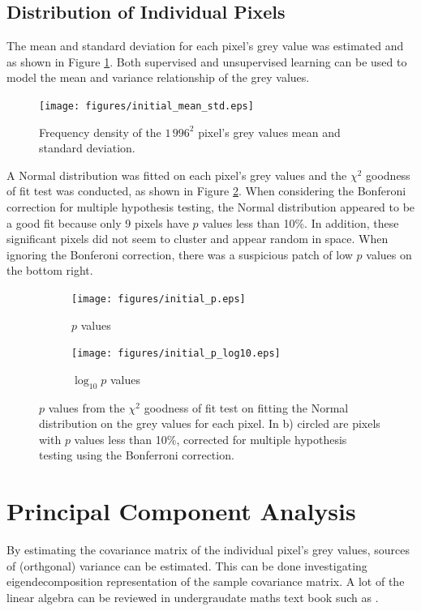 \documentclass[12pt]{report}
\begin{document}
\subsection{Distribution of Individual Pixels}
The mean and standard deviation for each pixel's grey value was estimated and as shown in Figure \ref{fig:initial_mean_std}. Both supervised and unsupervised learning can be used to model the mean and variance relationship of the grey values.

\begin{figure}
	\centering
	\texttt{[image: figures/initial\_mean\_std.eps]}
	\caption{Frequency density of the $1\,996^2$ pixel's grey values mean and standard deviation.}
	\label{fig:initial_mean_std}
\end{figure}

A Normal distribution was fitted on each pixel's grey values and the $\chi^2$ goodness of fit test was conducted, as shown in Figure \ref{fig:initial_fit_normal_test}. When considering the Bonferoni correction \cite{weisstein2004bonferroni} for multiple hypothesis testing, the Normal distribution appeared to be a good fit because only 9 pixels have $p$ values less than 10\%. In addition, these significant pixels did not seem to cluster and appear random in space. When ignoring the Bonferoni correction, there was a suspicious patch of low $p$ values on the bottom right.

\begin{figure}
\centering
	\begin{subfigure}[b]{0.75\textwidth}
		\texttt{[image: figures/initial\_p.eps]}
		\caption{$p$ values}
	\end{subfigure}
	\begin{subfigure}[b]{0.75\textwidth}
		\texttt{[image: figures/initial\_p\_log10.eps]}
		\caption{$\log_{10} p$ values}
	\end{subfigure}
	\caption{$p$ values from the $\chi^2$ goodness of fit test on fitting the Normal distribution on the grey values for each pixel. In b) circled are pixels with $p$ values less than 10\%, corrected for multiple hypothesis testing using the Bonferroni correction.}
	\label{fig:initial_fit_normal_test}
\end{figure}

\section{Principal Component Analysis}
By estimating the covariance matrix of the individual pixel's grey values, sources of (orthgonal) variance can be estimated. This can be done investigating eigendecomposition representation of the sample covariance matrix. A lot of the linear algebra can be reviewed in undergraudate maths text book such as \cite{riley2006mathematical}.
\end{document}
